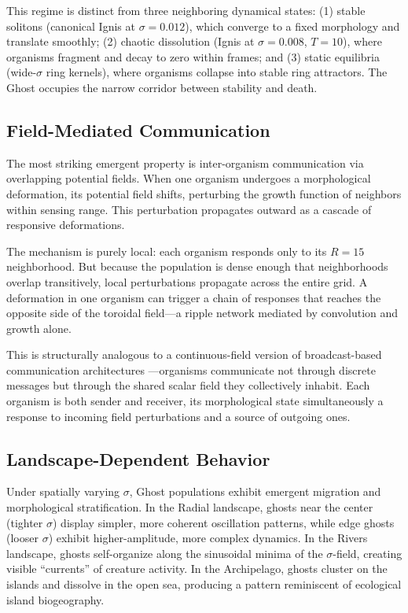 \documentclass[11pt,a4paper]{article}
\begin{document}
This regime is distinct from three neighboring dynamical states: (1) stable
solitons (canonical Ignis at $\sigma = 0.012$), which converge to a fixed
morphology and translate smoothly; (2) chaotic dissolution (Ignis at
$\sigma = 0.008$, $T = 10$), where organisms fragment and decay to zero
within frames; and (3) static equilibria (wide-$\sigma$ ring kernels),
where organisms collapse into stable ring attractors. The Ghost occupies
the narrow corridor between stability and death.

\subsection{Field-Mediated Communication}

The most striking emergent property is inter-organism communication via
overlapping potential fields. When one organism undergoes a morphological
deformation, its potential field shifts, perturbing the growth function of
neighbors within sensing range. This perturbation propagates outward as a
cascade of responsive deformations.

The mechanism is purely local: each organism responds only to its $R = 15$
neighborhood. But because the population is dense enough that neighborhoods
overlap transitively, local perturbations propagate across the entire grid.
A deformation in one organism can trigger a chain of responses that reaches
the opposite side of the toroidal field---a ripple network mediated by
convolution and growth alone.

This is structurally analogous to a continuous-field version of
broadcast-based communication architectures \citep[cf.][]{tsarev2024}---organisms
communicate not through discrete messages but through the shared scalar
field they collectively inhabit. Each organism is both sender and receiver,
its morphological state simultaneously a response to incoming field
perturbations and a source of outgoing ones.

\subsection{Landscape-Dependent Behavior}

Under spatially varying $\sigma$, Ghost populations exhibit emergent
migration and morphological stratification. In the Radial landscape, ghosts
near the center (tighter $\sigma$) display simpler, more coherent
oscillation patterns, while edge ghosts (looser $\sigma$) exhibit
higher-amplitude, more complex dynamics. In the Rivers landscape, ghosts
self-organize along the sinusoidal minima of the $\sigma$-field, creating
visible ``currents'' of creature activity. In the Archipelago, ghosts
cluster on the islands and dissolve in the open sea, producing a pattern
reminiscent of ecological island biogeography.
\end{document}
